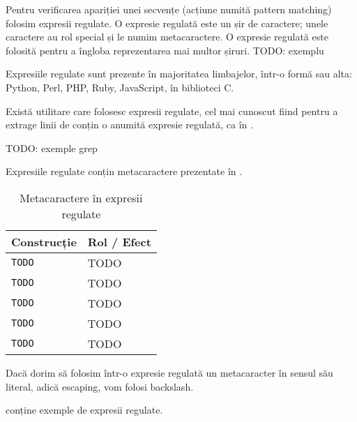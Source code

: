 Pentru verificarea apariției unei secvențe (acțiune numită pattern matching)
folosim expresii regulate. O expresie regulată este un șir de caractere; unele
caractere au rol special și le numim metacaractere. O expresie regulată este
folosită pentru a îngloba reprezentarea mai multor șiruri. TODO: exemplu

Expresiile regulate sunt prezente în majoritatea limbajelor, într-o formă sau
alta: Python, Perl, PHP, Ruby, JavaScript, în biblioteci C.

Există utilitare care folosesc expresii regulate, cel mai cunoscut fiind 
pentru a extrage linii de conțin o anumită expresie regulată, ca în .

\begin{screen}[caption={Expresii regulate în grep},label={lst:cli:grep}]
TODO: exemple grep
\end{screen}

Expresiile regulate conțin metacaractere prezentate în .

\begin{table}[!htb]
  \caption{Metacaractere în expresii regulate}
  \begin{center}
    \begin{tabular}{ p{} p{} }
      \toprule
        \textbf{Construcție} &
        \textbf{Rol / Efect} \\
      \midrule
        \texttt{TODO} &
        TODO \\

        \texttt{TODO} &
        TODO \\

        \texttt{TODO} &
        TODO \\

        \texttt{TODO} &
        TODO \\

        \texttt{TODO} &
        TODO \\

      \bottomrule
    \end{tabular}
    \label{tab:cli:regex-chars}
  \end{center}
\end{table}

Dacă dorim să folosim într-o expresie regulată un metacaracter în sensul său
literal, adică escaping, vom folosi backslash.

 conține exemple de expresii regulate.

